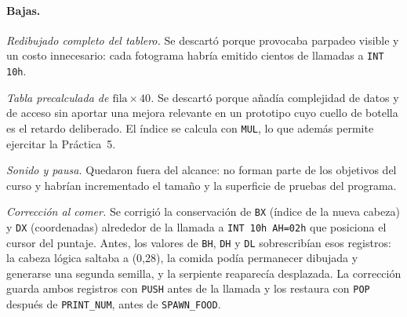 \documentclass[10pt]{article}
\begin{document}
\paragraph{Bajas.}
\emph{Redibujado completo del tablero.} Se descartó porque provocaba parpadeo visible y un costo innecesario: cada fotograma habría emitido cientos de llamadas a \texttt{INT 10h}.

\emph{Tabla precalculada de $\text{fila}\times 40$.} Se descartó porque añadía complejidad de datos y de acceso sin aportar una mejora relevante en un prototipo cuyo cuello de botella es el retardo deliberado. El índice se calcula con \texttt{MUL}, lo que además permite ejercitar la Práctica~5.

\emph{Sonido y pausa.} Quedaron fuera del alcance: no forman parte de los objetivos del curso y habrían incrementado el tamaño y la superficie de pruebas del programa.

\emph{Corrección al comer.} Se corrigió la conservación de \texttt{BX} (índice de la nueva cabeza) y \texttt{DX} (coordenadas) alrededor de la llamada a \texttt{INT 10h AH=02h} que posiciona el cursor del puntaje. Antes, los valores de \texttt{BH}, \texttt{DH} y \texttt{DL} sobrescribían esos registros: la cabeza lógica saltaba a (0,28), la comida podía permanecer dibujada y generarse una segunda semilla, y la serpiente reaparecía desplazada. La corrección guarda ambos registros con \texttt{PUSH} antes de la llamada y los restaura con \texttt{POP} después de \texttt{PRINT\_NUM}, antes de \texttt{SPAWN\_FOOD}.
\end{document}
